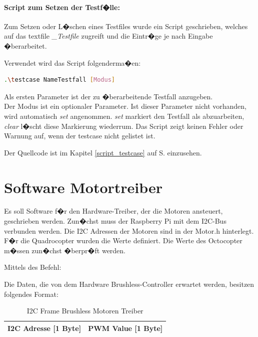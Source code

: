 \paragraph{Script zum Setzen der Testf�lle:}

Zum Setzen oder L�schen eines Testfiles wurde ein Script geschrieben, welches auf das textfile \textit{\_Testfile} zugreift und die Eintr�ge je nach Eingabe �berarbeitet.

Verwendet wird das Script folgenderma�en:

\begin{lstlisting}[language=bash]
.\testcase NameTestfall [Modus]
\end{lstlisting}
 	 
Als ersten Parameter ist der zu �berarbeitende Testfall anzugeben.\\
Der Modus ist ein optionaler Parameter. Ist dieser Parameter nicht vorhanden, wird automatisch \emph{set} angenommen. \textit{set} markiert den Testfall als abzuarbeiten, \textit{clear} l�scht diese Markierung wiederrum. Das Script zeigt keinen Fehler oder Warnung auf, wenn der testcase nicht gelistet ist.

Der Quellcode ist im Kapitel \ref{script_testcase}  auf S.\pageref{script_testcase} einzusehen.


\section{Software Motortreiber}

Es soll Software f�r den Hardware-Treiber, der die Motoren ansteuert, geschrieben werden. Zun�chst muss der Raspberry Pi mit dem I2C-Bus verbunden werden. 
Die I2C Adressen der Motoren sind in der Motor.h hinterlegt. F�r die Quadrocopter wurden die Werte definiert. Die Werte des Octocopter m�ssen zun�chst �berpr�ft werden.

Mittels des Befehl:

Die Daten, die von dem Hardware Brushless-Controller erwartet werden, besitzen folgendes Format:

	\begin{table}[H]
		\centering
		\begin{tabular}{|c|c|}
			\hline
			I2C Adresse [1 Byte] & PWM Value [1 Byte]\\ \hline
		\end{tabular}
	\caption{I2C Frame Brushless Motoren Treiber}
	\end{table}

